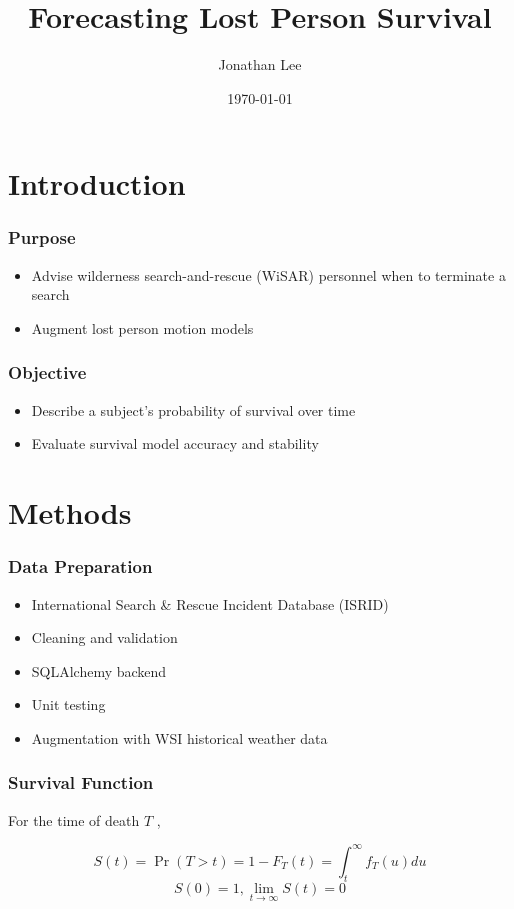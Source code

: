 \documentclass[serif,final,bigger]{beamer}
\title{Forecasting Lost Person Survival}
\author{Jonathan Lee}
\institute{TJHSST Computer Systems Lab}
\date{\today}
\begin{document}
  \begin{frame}
    \titlepage
  \end{frame}
  \usebackgroundtemplate{}

  \section{Introduction}

  \begin{frame}
    \frametitle{Purpose}
    \begin{itemize}
      \item
        Advise wilderness search-and-rescue (WiSAR) personnel when to terminate
        a search
      \item
        Augment lost person motion models \cite{semple}
    \end{itemize}
  \end{frame}

  \begin{frame}
    \frametitle{Objective}
    \begin{itemize}
      \item
        Describe a subject's probability of survival over time
      \item
        Evaluate survival model accuracy and stability
    \end{itemize}
  \end{frame}

  \section{Methods}

  \begin{frame}
    \frametitle{Data Preparation}
    \begin{itemize}
      \item
        International Search \& Rescue Incident Database (ISRID) \cite{isrid}
      \item
        Cleaning and validation
      \item
        SQLAlchemy backend \cite{sqlalchemy}
      \item
        Unit testing
      \item
        Augmentation with WSI historical weather data \cite{wsi}
    \end{itemize}
  \end{frame}

  \begin{frame}
    \frametitle{Survival Function}
    For the time of death \(T\) \cite{rochford},

    $$S(t) = \Pr(T > t) = 1 - F_T(t) = \int_t^\infty f_T(u) du$$
    $$S(0) = 1, \lim_{t \to \infty} S(t) = 0$$
  \end{frame}
\end{document}
